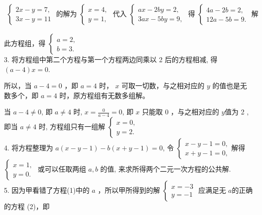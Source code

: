 \documentclass[10pt]{article}
\begin{document}
\begin{align*}
\left\{\begin{array} { l } 
{ 2 x - y = 7 , } \\
{ 3 x - y = 1 1 }
\end{array} \text { 的解为 } \left\{\begin{array} { l } 
{ x = 4 , } \\
{ y = 1 , }
\end{array} \text { 代入 } \left\{\begin{array} { l } 
{ a x - 2 b y = 2 , } \\
{ 3 a x - 5 b y = 9 , }
\end{array} \text { 得 } \left\{\begin{array}{l}
4 a-2 b=2, \\
12 a-5 b=9 .
\end{array}\right.\right.\right.\right. \text { 解 }
\end{align*}

此方程组，得 $\left\{\begin{array}{l}a=2, \\ b=3 .\end{array}\right.$\\
3. 将方程组中第二个方程与第一个方程两边同乘以 2 后的方程相减, 得 $(a-4) x=0$.

所以，当 $a-4=0$ ，即 $a=4$ 时， $x$ 可取一切数，与之相对应的 $y$ 的值也是无数多个，即 $a=4$ 时，原方程组有无数多组解。

当 $a-4 \neq 0$, 即 $a \neq 4$ 时, $x=\frac{0}{a-4}=0$, 即 $x$ 只能取 0 ，与之相对应的 $y$值为 2 , 即当 $a \neq 4$ 时, 方程组只有一组解 $\left\{\begin{array}{l}x=0, \\ y=2 .\end{array}\right.$\\
4. 将方程整理为 $a(x-y-1)-b(x+y-1)=0$, 令 $\left\{\begin{array}{l}x-y-1=0, \\ x+y-1=0,\end{array}\right.$解得 $\left\{\begin{array}{l}x=1, \\ y=0 .\end{array}\right.$ 或可以任取两组 $a, b$ 的值, 来求所得两个二元一次方程的公共解.\\
5. 因为甲看错了方程(1)中的 $a$ ，所以甲所得到的解 $\left\{\begin{array}{l}x=-3 \\ y=-1\end{array}\right.$ 应满足无 $a$的正确的方程 (2)，即
\end{document}

